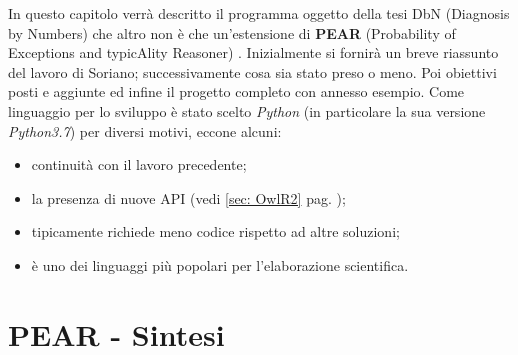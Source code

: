 In questo capitolo verrà descritto il programma oggetto della tesi DbN (Diagnosis by Numbers) che altro 
non è che un'estensione di \textbf{PEAR} (Probability of Exceptions and typicAlity Reasoner) \cite{PEAR}.
Inizialmente si fornirà un breve riassunto del lavoro di Soriano; successivamente cosa sia stato preso o meno.
Poi obiettivi posti e aggiunte ed infine il progetto completo con annesso esempio.
Come linguaggio per lo sviluppo è stato scelto \emph{Python} (in particolare la sua
versione \textit{Python3.7}) per diversi motivi, eccone alcuni:
\begin{itemize}
	\item continuità con il lavoro precedente;
	\item la presenza di nuove API (vedi \ref{sec: OwlR2} pag. \pageref{sec: OwlR2});
	\item tipicamente richiede meno codice rispetto ad altre soluzioni;
	\item è uno dei linguaggi più popolari per l'elaborazione scientifica.
\end{itemize}

\section{PEAR - Sintesi}
